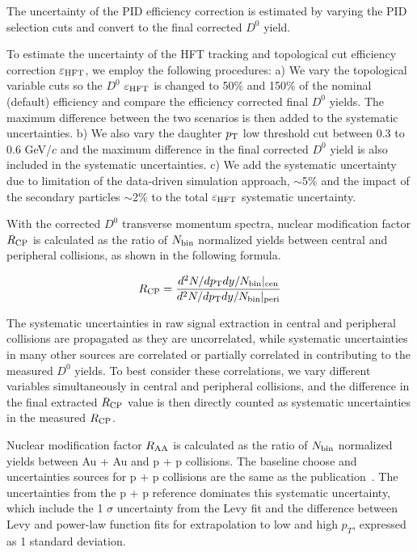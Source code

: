 \documentclass[%
 reprint,	
 amsmath,amssymb,
 aps,
 prc,
]{revtex4-1}
\begin{document}
The uncertainty of the PID efficiency correction is estimated by varying the PID selection cuts and convert to the final corrected $D^0$ yield. 


To estimate the uncertainty of the HFT tracking and topological cut efficiency correction $\varepsilon_{\rm HFT}$, we employ the following procedures: a) We vary the topological variable cuts so the $D^0$ $\varepsilon_{\rm HFT}$ is changed to 50\% and 150\% of the nominal (default) efficiency and compare the efficiency corrected final $D^0$ yields. The maximum difference between the two scenarios is then added to the systematic uncertainties. b) We also vary the daughter $p_{\rm T}$ low threshold cut between 0.3 to 0.6 GeV/$c$ and the maximum difference in the final corrected $D^0$ yield is also included in the systematic uncertainties. c) We add the systematic uncertainty due to limitation of the data-driven simulation approach, $\sim$5\% and the impact of the secondary particles $\sim$2\% to the total $\varepsilon_{\rm HFT}$ systematic uncertainty.%

With the corrected $D^0$ transverse momentum spectra, nuclear modification factor $R_{\rm CP}$ is calculated as the ratio of $N_{\rm bin}$ normalized yields between central and peripheral collisions, as shown in the following formula. 

\[
R_{\rm CP} = \frac{d^2N/dp_{\rm T}dy/N_{\rm bin}|_{\rm cen}}{d^2N/dp_{\rm T}dy/N_{\rm bin}|_{\rm peri}}
\]

The systematic uncertainties in raw signal extraction in central and peripheral collisions are propagated as they are uncorrelated, while systematic uncertainties in many other sources are correlated or partially correlated in contributing to the measured $D^0$ yields. To best consider these correlations, we vary different variables simultaneously in central and peripheral collisions, and the difference in the final extracted $R_{\rm CP}$ value is then directly counted as systematic uncertainties in the measured $R_{\rm CP}$.

Nuclear modification factor $R_{\rm AA}$ is calculated as the ratio of $N_{\rm bin}$ normalized yields between Au + Au and p + p collisions. The baseline choose and uncertainties sources for p + p collisions are the same as the publication~\cite{Star_D_RAA_corr}. The uncertainties from the p + p reference dominates this systematic uncertainty, which include the 1 $\sigma$ uncertainty from the Levy fit and the difference between Levy and power-law function fits for extrapolation to low and high $p_T$, expressed as 1 standard deviation.
\end{document}
